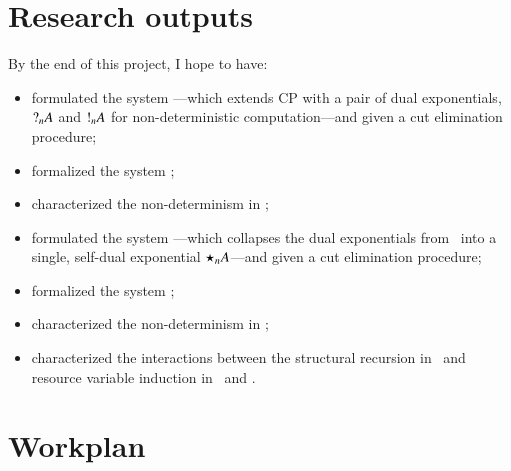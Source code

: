 \documentclass[twocolumn]{article}
\begin{document}
\section{Research outputs}
By the end of this project, I hope to have:
\begin{itemize}
\item%
  formulated the system \gtcp---which extends CP with a pair of dual
  exponentials, $\give[n]{A}$ and $\take[n]{A}$ for non-deterministic
  computation---and given a cut elimination procedure;
\item%
  formalized the system \gtcp;
\item%
  characterized the non-determinism in \gtcp;
\item%
  formulated the system \ndcp---which collapses the dual exponentials
  from \gtcp\ into a single, self-dual exponential $\nod[n]{A}$---and given a
  cut elimination procedure;
\item%
  formalized the system \ndcp;
\item%
  characterized the non-determinism in \ndcp;
\item%
  characterized the interactions between the structural recursion in \mucp\ and
  resource variable induction in \gtcp\ and \ndcp.
\end{itemize}

\section{Workplan}



\nocite{*}
\end{document}

